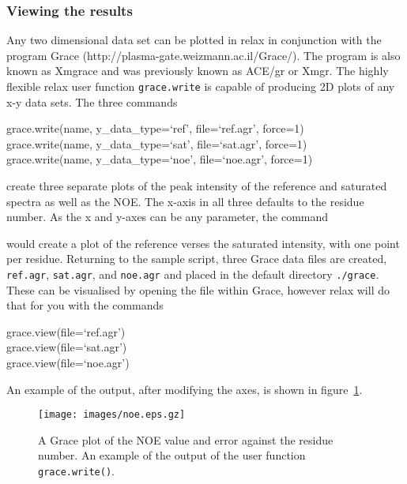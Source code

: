 \subsubsection{Viewing the results}

Any two dimensional data set can be plotted in relax in conjunction with the program Grace (http://plasma-gate.weizmann.ac.il/Grace/).  The program is also known as Xmgrace and was previously known as ACE/gr or Xmgr.  The highly flexible relax user function \texttt{grace.write} is capable of producing 2D plots of any x-y data sets.  The three commands

\begin{exampleenv}
grace.write(name, y\_data\_type=`ref', file=`ref.agr', force=1) \\
grace.write(name, y\_data\_type=`sat', file=`sat.agr', force=1) \\
grace.write(name, y\_data\_type=`noe', file=`noe.agr', force=1) \\
\end{exampleenv}

create three separate plots of the peak intensity of the reference and saturated spectra as well as the NOE.  The x-axis in all three defaults to the residue number.  As the x and y-axes can be any parameter, the command


would create a plot of the reference verses the saturated intensity, with one point per residue.  Returning to the sample script, three Grace data files are created, \texttt{ref.agr}, \texttt{sat.agr}, and \texttt{noe.agr} and placed in the default directory \texttt{./grace}.  These can be visualised by opening the file within Grace, however relax will do that for you with the commands

\begin{exampleenv}
grace.view(file=`ref.agr') \\
grace.view(file=`sat.agr') \\
grace.view(file=`noe.agr') \\
\end{exampleenv}

An example of the output, after modifying the axes, is shown in figure~\ref{fig: NOE plot}.

\begin{figure}
\centerline{\texttt{[image: images/noe.eps.gz]}}
\caption[NOE plot]{A Grace plot of the NOE value and error against the residue number.  An example of the output of the user function \texttt{grace.write()}.}\label{fig: NOE plot}
\end{figure}



